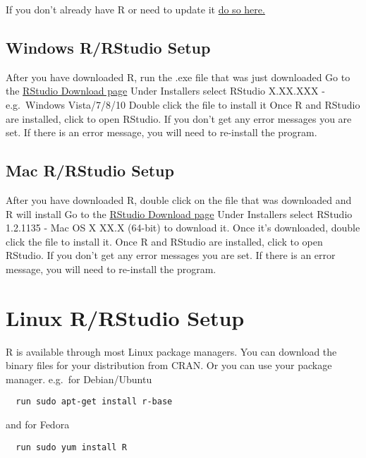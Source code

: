 \documentclass[]{book}
\begin{document}
If you don't already have R or need to update it \href{https://cran.rstudio.com/}{do so here.}

\hypertarget{windows-rrstudio-setup}{%
\subsection{Windows R/RStudio Setup}\label{windows-rrstudio-setup}}

After you have downloaded R, run the .exe file that was just downloaded
Go to the \href{https://www.rstudio.com/products/rstudio/download/\#download}{RStudio Download page}
Under Installers select RStudio X.XX.XXX - e.g.~Windows Vista/7/8/10
Double click the file to install it
Once R and RStudio are installed, click to open RStudio. If you don't get any error messages you are set. If there is an error message, you will need to re-install the program.

\hypertarget{mac-rrstudio-setup}{%
\subsection{Mac R/RStudio Setup}\label{mac-rrstudio-setup}}

After you have downloaded R, double click on the file that was downloaded and R will install
Go to the \href{https://www.rstudio.com/products/rstudio/download/\#download}{RStudio Download page}
Under Installers select RStudio 1.2.1135 - Mac OS X XX.X (64-bit) to download it.
Once it's downloaded, double click the file to install it.
Once R and RStudio are installed, click to open RStudio. If you don't get any error messages you are set. If there is an error message, you will need to re-install the program.

\hypertarget{linux-rrstudio-setup}{%
\section{Linux R/RStudio Setup}\label{linux-rrstudio-setup}}

R is available through most Linux package managers. You can download the binary files for your distribution from CRAN. Or you can use your package manager.
e.g.~for Debian/Ubuntu

\begin{verbatim}
  run sudo apt-get install r-base
\end{verbatim}

and for Fedora

\begin{verbatim}
  run sudo yum install R
\end{verbatim}
\end{document}
